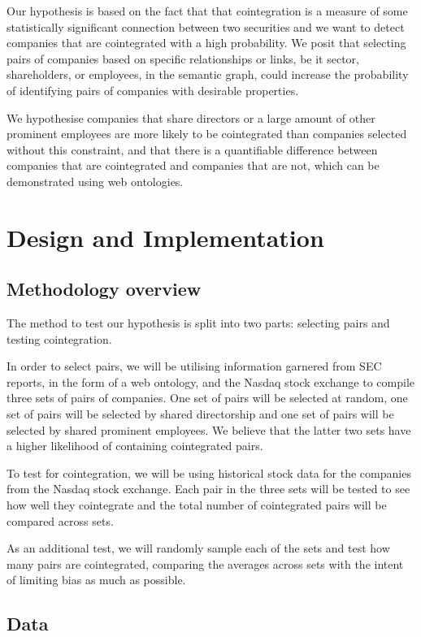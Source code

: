 \documentclass{UoYCSproject}
\begin{document}
Our hypothesis is based on the fact that that cointegration is a measure of some statistically significant connection between two securities and we want to detect companies that are cointegrated with a high probability. We posit that selecting pairs of companies based on specific relationships or links, be it sector, shareholders, or employees, in the semantic graph, could increase the probability of identifying pairs of companies with desirable properties. 

We hypothesise companies that share directors or a large amount of other prominent employees are more likely to be cointegrated than companies selected without this constraint, and that there is a quantifiable difference between companies that are cointegrated and companies that are not, which can be demonstrated using web ontologies.

\chapter{Design and Implementation}
\label{cha:Design and Implementation}

\section{Methodology overview}

The method to test our hypothesis is split into two parts: selecting pairs and testing cointegration.

In order to select pairs, we will be utilising information garnered from SEC reports, in the form of a web ontology, and the Nasdaq stock exchange to compile three sets of pairs of companies. One set of pairs will be selected at random, one set of pairs will be selected by shared directorship and one set of pairs will be selected by shared prominent employees. We believe that the latter two sets have a higher likelihood of containing cointegrated pairs.

To test for cointegration, we will be using historical stock data for the companies from the Nasdaq stock exchange. Each pair in the three sets will be tested to see how well they cointegrate and the total number of cointegrated pairs will be compared across sets.

As an additional test, we will randomly sample each of the sets and test how many pairs are cointegrated, comparing the averages across sets with the intent of limiting bias as much as possible.

\section{Data}
\end{document}
